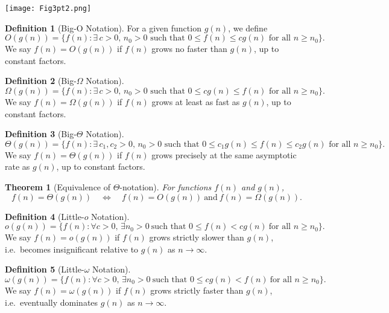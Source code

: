 \documentclass[12pt]{article}
\newtheorem{theorem}{Theorem}
\theoremstyle{definition}
\newtheorem{definition}{Definition}
\begin{document}
\begin{center}
\texttt{[image: Fig3pt2.png]}
\end{center}

\begin{definition}[Big-O Notation]
For a given function $g(n)$, we define
\[
O(g(n)) = \{ f(n) : \exists \, c > 0, \, n_0 > 0 \text{ such that } 0 \leq f(n) \leq c g(n) \text{ for all } n \geq n_0 \}.
\]
We say $f(n) = O(g(n))$ if $f(n)$ grows no faster than $g(n)$, up to constant factors.
\end{definition}

\begin{definition}[Big-$\Omega$ Notation]
\[
\Omega(g(n)) = \{ f(n) : \exists \, c > 0, \, n_0 > 0 \text{ such that } 0 \leq c g(n) \leq f(n) \text{ for all } n \geq n_0 \}.
\]
We say $f(n) = \Omega(g(n))$ if $f(n)$ grows at least as fast as $g(n)$, up to constant factors.
\end{definition}

\begin{definition}[Big-$\Theta$ Notation]
\[
\Theta(g(n)) = \{ f(n) : \exists \, c_1, c_2 > 0, \, n_0 > 0 \text{ such that } 0 \leq c_1 g(n) \leq f(n) \leq c_2 g(n) \text{ for all } n \geq n_0 \}.
\]
We say $f(n) = \Theta(g(n))$ if $f(n)$ grows precisely at the same asymptotic rate as $g(n)$, up to constant factors.
\end{definition}

\begin{theorem}[Equivalence of $\Theta$-notation]
For functions $f(n)$ and $g(n)$,
\[
f(n) = \Theta(g(n)) \quad \iff \quad f(n) = O(g(n)) \ \text{and} \ f(n) = \Omega(g(n)).
\]
\end{theorem}

\begin{definition}[Little-$o$ Notation]
\[
o(g(n)) = \{ f(n) : \forall c > 0, \, \exists n_0 > 0 \ \text{such that } 0 \leq f(n) < c g(n) \ \text{for all } n \geq n_0 \}.
\]
We say $f(n) = o(g(n))$ if $f(n)$ grows strictly slower than $g(n)$, i.e.\ becomes insignificant relative to $g(n)$ as $n \to \infty$.
\end{definition}

\begin{definition}[Little-$\omega$ Notation]
\[
\omega(g(n)) = \{ f(n) : \forall c > 0, \, \exists n_0 > 0 \ \text{such that } 0 \leq c g(n) < f(n) \ \text{for all } n \geq n_0 \}.
\]
We say $f(n) = \omega(g(n))$ if $f(n)$ grows strictly faster than $g(n)$, i.e.\ eventually dominates $g(n)$ as $n \to \infty$.
\end{definition}
\end{document}
